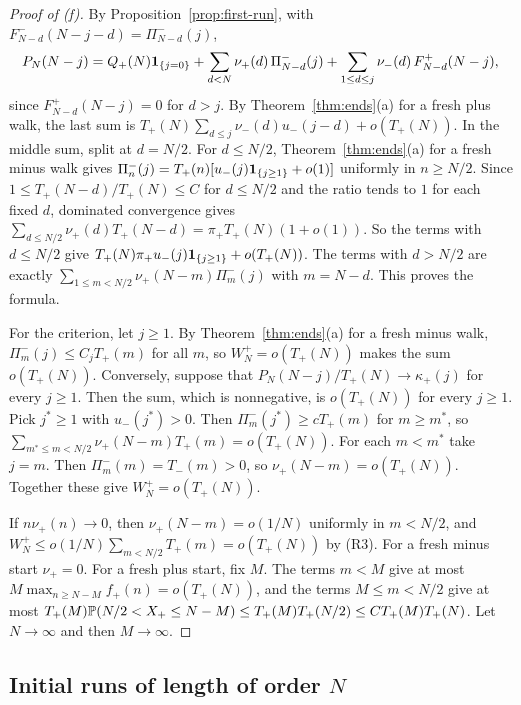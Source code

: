 \begin{proof}[Proof of (f)]
By Proposition~\ref{prop:first-run}, with $F^\minus_{N-d}(N-j-d)=\Pi^\minus_{N-d}(j)$,
\[
 P_N(N-j)=Q_{+}(N)\mathbf{1}_{\{j=0\}}+\sum_{d<N}\nu_{+}(d)\,\Pi^{-}_{N-d}(j)
 +\sum_{1\le d\le j}\nu_{-}(d)\,F^{+}_{N-d}(N-j),
\]
since $F^\plus_{N-d}(N-j)=0$ for $d>j$. By Theorem~\ref{thm:ends}(a) for a fresh plus walk,
the last sum is $T_\plus(N)\sum_{d\le j}\nu_\minus(d)u_\minus(j-d)+o(T_\plus(N))$. In the
middle sum, split at $d=N/2$. For $d\le N/2$, Theorem~\ref{thm:ends}(a) for a fresh minus
walk gives $\Pi^{-}_n(j)=T_{+}(n)[u_{-}(j)\mathbf{1}_{\{j\ge1\}}+o(1)]$ uniformly in
$n\ge N/2$. Since $1\le T_\plus(N-d)/T_\plus(N)\le C$ for $d\le N/2$ and the ratio tends to
$1$ for each fixed $d$, dominated convergence gives
$\sum_{d\le N/2}\nu_\plus(d)T_\plus(N-d)=\pi_\plus T_\plus(N)(1+o(1))$. So the terms with
$d\le N/2$ give $T_{+}(N)\pi_{+} u_{-}(j)\mathbf{1}_{\{j\ge1\}}+o(T_{+}(N))$. The terms
with $d>N/2$ are exactly $\sum_{1\le m<N/2}\nu_\plus(N-m)\Pi^\minus_m(j)$ with $m=N-d$. This
proves the formula.

For the criterion, let $j\ge1$. By Theorem~\ref{thm:ends}(a) for a fresh minus walk,
$\Pi^\minus_m(j)\le C_jT_\plus(m)$ for all $m$, so $W^\plus_N=o(T_\plus(N))$ makes the sum
$o(T_\plus(N))$. Conversely, suppose that $P_N(N-j)/T_\plus(N)\to\kappa_\plus(j)$ for every
$j\ge1$. Then the sum, which is nonnegative, is $o(T_\plus(N))$ for every $j\ge1$. Pick
$j^*\ge1$ with $u_\minus(j^*)>0$. Then $\Pi^\minus_m(j^*)\ge cT_\plus(m)$ for $m\ge m^*$, so
$\sum_{m^*\le m<N/2}\nu_\plus(N-m)T_\plus(m)=o(T_\plus(N))$. For each $m<m^*$ take $j=m$.
Then $\Pi^\minus_m(m)=T_\minus(m)>0$, so $\nu_\plus(N-m)=o(T_\plus(N))$. Together these give
$W^\plus_N=o(T_\plus(N))$.

If $n\nu_\plus(n)\to0$, then $\nu_\plus(N-m)=o(1/N)$ uniformly in $m<N/2$, and
$W^\plus_N\le o(1/N)\sum_{m<N/2}T_\plus(m)=o(T_\plus(N))$ by (R3). For a fresh minus start
$\nu_\plus=0$. For a fresh plus start, fix $M$. The terms $m<M$ give at most
$M\max_{n\ge N-M}f_\plus(n)=o(T_\plus(N))$, and the terms $M\le m<N/2$ give at most
$T_{+}(M)\mathbb{P}(N/2<X_{+}\le N-M)\le T_{+}(M)T_{+}(N/2)\le CT_{+}(M)T_{+}(N)$. Let
$N\to\infty$ and then $M\to\infty$.
\end{proof}

\subsection{\texorpdfstring{Initial runs of length of order $N$}{Initial runs of length of order N}}

